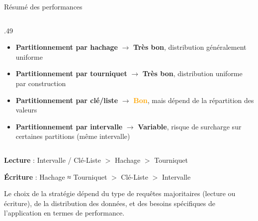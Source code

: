 \begin{frame}{Résumé des performances}
{\begin{columns}[t,onlytextwidth]
\begin{column}{.49\textwidth}
                \small
                \begin{itemize}
                    \item \textbf{Partitionnement par hachage} $\rightarrow$ \textcolor{customgreen}{\textbf{Très bon}}, distribution généralement uniforme
                    \item \textbf{Partitionnement par tourniquet} $\rightarrow$ \textcolor{customgreen}{\textbf{Très bon}}, distribution uniforme par construction
                    \item \textbf{Partitionnement par clé/liste} $\rightarrow$ \textcolor{orange}{\textbf{Bon}}, mais dépend de la répartition des valeurs
                    \item \textbf{Partitionnement par intervalle} $\rightarrow$ \textcolor{customred}{\textbf{Variable}}, risque de surcharge sur certaines partitions (même intervalle)
                \end{itemize}
            \end{column}
        \end{columns}

        \vspace{0.2cm}

        \textbf{Lecture} : Intervalle / Clé-Liste $>$ Hachage $>$ Tourniquet

        \textbf{Écriture} : Hachage ≈ Tourniquet $>$ Clé-Liste $>$ Intervalle

        \vspace{0.2cm}

        Le choix de la stratégie dépend du type de requêtes majoritaires (lecture ou écriture), de la distribution des données, et des besoins spécifiques de l'application en termes de performance.

    }

\end{frame}
